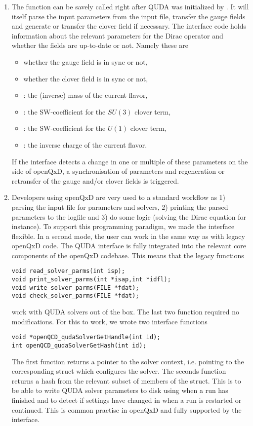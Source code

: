 \begin{enumerate}
  \item{The function can be savely called right after QUDA was initialized by . It will itself parse the input parameters from the input file, transfer the gauge fields and generate or transfer the clover field if necessary. The interface code holds information about the relevant parameters for the Dirac operator and whether the fields are up-to-date or not. Namely these are
  \begin{itemize}
    \item whether the gauge field is in sync or not,
    \item whether the clover field is in sync or not,
    \item {}: the (inverse) mass of the current flavor,
    \item {}: the SW-coefficient for the $SU(3)$ clover term,
    \item {}: the SW-coefficient for the $U(1)$ clover term,
    \item {}: the inverse charge of the current flavor.
  \end{itemize}
  If the interface detects a change in one or multiple of these parameters on the side of openQxD, a synchronisation of parameters and regeneration or retransfer of the gauge and/or clover fields is triggered.}
  \item{Developers using openQxD are very used to a standard workflow as 1) parsing the input file for parameters and solvers, 2) printing the parsed parameters to the logfile and 3) do some logic (solving the Dirac equation for instance). To support this programming paradigm, we made the interface flexible. In a second mode, the user can work in the same way as with legacy openQxD code. The QUDA interface is fully integrated into the relevant core components of the openQxD codebase. This means that the legacy functions
  \begin{verbatim}
void read_solver_parms(int isp);
void print_solver_parms(int *isap,int *idfl);
void write_solver_parms(FILE *fdat);
void check_solver_parms(FILE *fdat);
  \end{verbatim}
  work with QUDA solvers out of the box. The last two function required no modifications. For this to work, we wrote two interface functions
  \begin{verbatim}
void *openQCD_qudaSolverGetHandle(int id);
int openQCD_qudaSolverGetHash(int id);
  \end{verbatim}
  The first function returns a pointer to the solver context, i.e. pointing to the corresponding  struct which configures the solver. The seconds function returns a hash from the relevant subset of members of the  struct. This is to be able to write QUDA solver parameters to disk using  when a run has finished and to detect if settings have changed in  when a run is restarted or continued. This is common practise in openQxD and fully supported by the interface.
  }
\end{enumerate}

